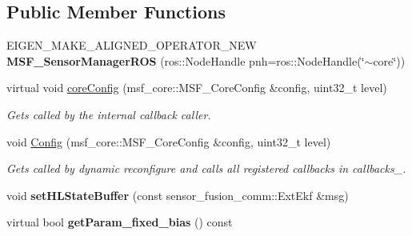 \subsection*{Public Member Functions}
\begin{DoxyCompactItemize}
\item 
\hypertarget{structmsf__core_1_1MSF__SensorManagerROS_a1d665e46ae9945ab6a129575c4400bd3}{E\-I\-G\-E\-N\-\_\-\-M\-A\-K\-E\-\_\-\-A\-L\-I\-G\-N\-E\-D\-\_\-\-O\-P\-E\-R\-A\-T\-O\-R\-\_\-\-N\-E\-W {\bfseries M\-S\-F\-\_\-\-Sensor\-Manager\-R\-O\-S} (ros\-::\-Node\-Handle pnh=ros\-::\-Node\-Handle(\char`\"{}$\sim$core\char`\"{}))}\label{structmsf__core_1_1MSF__SensorManagerROS_a1d665e46ae9945ab6a129575c4400bd3}

\item 
\hypertarget{structmsf__core_1_1MSF__SensorManagerROS_a092e5cecd4d0586303c0412e55959603}{virtual void \hyperlink{structmsf__core_1_1MSF__SensorManagerROS_a092e5cecd4d0586303c0412e55959603}{core\-Config} (msf\-\_\-core\-::\-M\-S\-F\-\_\-\-Core\-Config \&config, uint32\-\_\-t level)}\label{structmsf__core_1_1MSF__SensorManagerROS_a092e5cecd4d0586303c0412e55959603}

\begin{DoxyCompactList}\small\item\em Gets called by the internal callback caller. \end{DoxyCompactList}\item 
\hypertarget{structmsf__core_1_1MSF__SensorManagerROS_a05d1f96502e2733ac5d9810f4dd55706}{void \hyperlink{structmsf__core_1_1MSF__SensorManagerROS_a05d1f96502e2733ac5d9810f4dd55706}{Config} (msf\-\_\-core\-::\-M\-S\-F\-\_\-\-Core\-Config \&config, uint32\-\_\-t level)}\label{structmsf__core_1_1MSF__SensorManagerROS_a05d1f96502e2733ac5d9810f4dd55706}

\begin{DoxyCompactList}\small\item\em Gets called by dynamic reconfigure and calls all registered callbacks in callbacks\-\_\-. \end{DoxyCompactList}\item 
\hypertarget{structmsf__core_1_1MSF__SensorManagerROS_a4b28905e8303ca5d74a2711c6483329c}{void {\bfseries set\-H\-L\-State\-Buffer} (const sensor\-\_\-fusion\-\_\-comm\-::\-Ext\-Ekf \&msg)}\label{structmsf__core_1_1MSF__SensorManagerROS_a4b28905e8303ca5d74a2711c6483329c}

\item 
\hypertarget{structmsf__core_1_1MSF__SensorManagerROS_a25e296341f9628b7e0c5616d09b1830b}{virtual bool {\bfseries get\-Param\-\_\-fixed\-\_\-bias} () const }\label{structmsf__core_1_1MSF__SensorManagerROS_a25e296341f9628b7e0c5616d09b1830b}


\end{DoxyCompactItemize}
